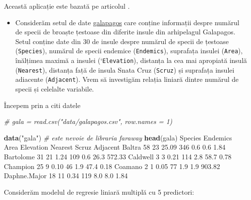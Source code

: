 \documentclass[]{article}
\newenvironment{Shaded}{\begin{snugshade}}{\end{snugshade}}
\newcommand{\KeywordTok}[1]{\textcolor[rgb]{0.13,0.29,0.53}{\textbf{#1}}}
\newcommand{\DecValTok}[1]{\textcolor[rgb]{0.00,0.00,0.81}{#1}}
\newcommand{\FloatTok}[1]{\textcolor[rgb]{0.00,0.00,0.81}{#1}}
\newcommand{\StringTok}[1]{\textcolor[rgb]{0.31,0.60,0.02}{#1}}
\newcommand{\CommentTok}[1]{\textcolor[rgb]{0.56,0.35,0.01}{\textit{#1}}}
\newcommand{\NormalTok}[1]{#1}
\newenvironment{frshaded*}{%
  \def\FrameCommand{\fboxrule=\FrameRule\fboxsep=\FrameSep \fcolorbox{framecolor}{shadecolor1}}%
  \MakeFramed {\advance\hsize-\width \FrameRestore}}%
{\endMakeFramed}
\newenvironment{rmdblock}[1]
  {\begin{frshaded*}
  \begin{itemize}
  \renewcommand{\labelitemi}{
    \raisebox{-.7\height}[0pt][0pt]{
      {\setkeys{Gin}{width=2em,keepaspectratio}\texttt{[image: images/icons/\#1]}}
    }
  }
  \item
  }
  {
  \end{itemize}
  \end{frshaded*}
  }
\newenvironment{rmdexercise}
  {\begin{rmdblock}{exercise}}
  {\end{rmdblock}}
\begin{document}
Această aplicație este bazată pe articolul \citep{Johnson1973}.

\begin{rmdexercise}
Considerăm setul de date \href{dataIn/galapagos.csv}{galapagos} care
conține informații despre numărul de specii de broaște țestoase din
diferite insule din arhipelagul Galapagos. Setul conține date din 30 de
insule despre numărul de specii de țestoase (\texttt{Species}), numărul
de specii endemice (\texttt{Endemics}), suprafața insulei
(\texttt{Area}), înălțimea maximă a insulei (`\texttt{Elevation}),
distanța la cea mai apropiată insulă (\texttt{Nearest}), distanța față
de insula Snata Cruz (\texttt{Scruz}) și suprafața insulei adiacente
(\texttt{Adjacent}). Vrem să investigăm relația liniară dintre numărul
de specii și celelalte variabile.
\end{rmdexercise}

Începem prin a citi datele

\begin{Shaded}
\begin{Highlighting}[]
\CommentTok{# gala = read.csv("data/galapagos.csv", row.names = 1)}

\KeywordTok{data}\NormalTok{(}\StringTok{"gala"}\NormalTok{) }\CommentTok{# este nevoie de libraria faraway}
\KeywordTok{head}\NormalTok{(gala)}
\NormalTok{             Species Endemics  Area Elevation Nearest Scruz Adjacent}
\NormalTok{Baltra            }\DecValTok{58}       \DecValTok{23} \FloatTok{25.09}       \DecValTok{346}     \FloatTok{0.6}   \FloatTok{0.6}     \FloatTok{1.84}
\NormalTok{Bartolome         }\DecValTok{31}       \DecValTok{21}  \FloatTok{1.24}       \DecValTok{109}     \FloatTok{0.6}  \FloatTok{26.3}   \FloatTok{572.33}
\NormalTok{Caldwell           }\DecValTok{3}        \DecValTok{3}  \FloatTok{0.21}       \DecValTok{114}     \FloatTok{2.8}  \FloatTok{58.7}     \FloatTok{0.78}
\NormalTok{Champion          }\DecValTok{25}        \DecValTok{9}  \FloatTok{0.10}        \DecValTok{46}     \FloatTok{1.9}  \FloatTok{47.4}     \FloatTok{0.18}
\NormalTok{Coamano            }\DecValTok{2}        \DecValTok{1}  \FloatTok{0.05}        \DecValTok{77}     \FloatTok{1.9}   \FloatTok{1.9}   \FloatTok{903.82}
\NormalTok{Daphne.Major      }\DecValTok{18}       \DecValTok{11}  \FloatTok{0.34}       \DecValTok{119}     \FloatTok{8.0}   \FloatTok{8.0}     \FloatTok{1.84}
\end{Highlighting}
\end{Shaded}

Considerăm modelul de regresie liniară multiplă cu 5 predictori:
\end{document}
